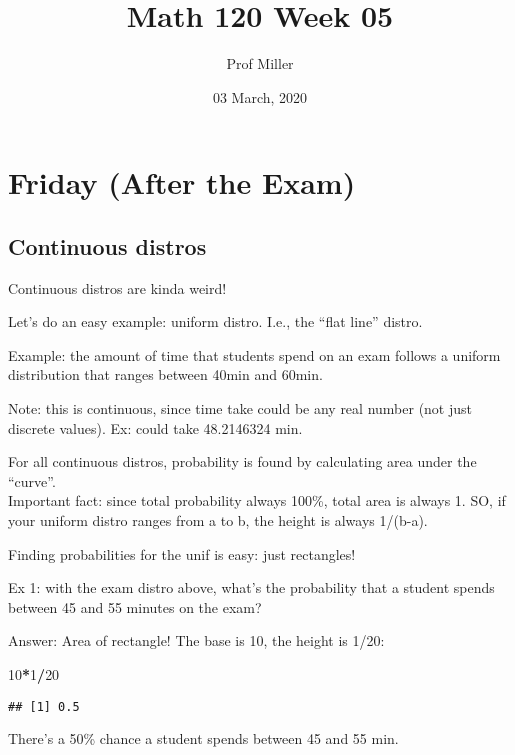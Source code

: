 \documentclass[]{article}
\title{Math 120 Week 05}
\author{Prof Miller}
\date{03 March, 2020}
\newenvironment{Shaded}{\begin{snugshade}}{\end{snugshade}}
\newcommand{\DecValTok}[1]{\textcolor[rgb]{0.00,0.00,0.81}{#1}}
\newcommand{\OperatorTok}[1]{\textcolor[rgb]{0.81,0.36,0.00}{\textbf{#1}}}
\begin{document}
\maketitle

{
\setcounter{tocdepth}{3}
\tableofcontents
}
\hypertarget{friday-after-the-exam}{%
\section{Friday (After the Exam)}\label{friday-after-the-exam}}

\hypertarget{continuous-distros}{%
\subsection{Continuous distros}\label{continuous-distros}}

Continuous distros are kinda weird!

Let's do an easy example: uniform distro. I.e., the ``flat line''
distro.

Example: the amount of time that students spend on an exam follows a
uniform distribution that ranges between 40min and 60min.

Note: this is continuous, since time take could be any real number (not
just discrete values). Ex: could take 48.2146324 min.

For all continuous distros, probability is found by calculating area
under the ``curve''.\\
Important fact: since total probability always 100\%, total area is
always 1. SO, if your uniform distro ranges from a to b, the height is
always 1/(b-a).

Finding probabilities for the unif is easy: just rectangles!

Ex 1: with the exam distro above, what's the probability that a student
spends between 45 and 55 minutes on the exam?

Answer: Area of rectangle! The base is 10, the height is 1/20:

\begin{Shaded}
\begin{Highlighting}[]
\DecValTok{10}\OperatorTok{*}\DecValTok{1}\OperatorTok{/}\DecValTok{20}
\end{Highlighting}
\end{Shaded}

\begin{verbatim}
## [1] 0.5
\end{verbatim}

There's a 50\% chance a student spends between 45 and 55 min.
\end{document}
